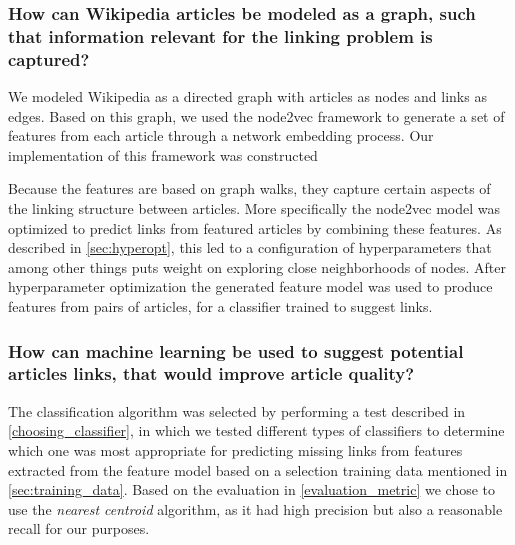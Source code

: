\subsubsection*{How can Wikipedia articles be modeled as a graph, such that information relevant for the linking problem is captured?}


We modeled Wikipedia as a directed graph with articles as nodes and links as edges. Based on this graph, we used the node2vec framework to generate a set of features from each article through a network embedding process. Our implementation of this framework was constructed 




Because the features are based on graph walks, they capture certain aspects of the linking structure between articles. More specifically the node2vec model was optimized to predict links from featured articles by combining these features. As described in \cref{sec:hyperopt}, this led to a configuration of hyperparameters that among other things puts weight on exploring close neighborhoods of nodes. After hyperparameter optimization the generated feature model was used to produce features from pairs of articles, for a classifier trained to suggest links.

\subsubsection*{How can machine learning be used to suggest potential articles links, that would improve article quality?}


The classification algorithm was selected by performing a test described in \cref{choosing_classifier}, in which we tested different types of classifiers to determine which one was most appropriate for predicting missing links from features extracted from the feature model based on a selection training data mentioned in \cref{sec:training_data}. Based on the evaluation in \cref{evaluation_metric} we chose to use the \emph{nearest centroid} algorithm, as it had high precision but also a reasonable recall for our purposes. 

